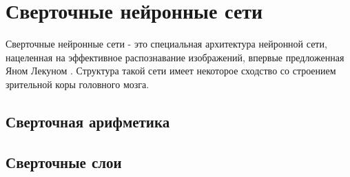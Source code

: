\section{Сверточные нейронные сети}
	Сверточные нейронные сети - это специальная архитектура нейронной сети, нацеленная на эффективное распознавание изображений, впервые предложенная Яном Лекуном \cite{CNN-original}. Структура такой сети имеет некоторое сходство со строением зрительной коры головного мозга.
	\subsection{Сверточная арифметика}
	\subsection{Сверточные слои}